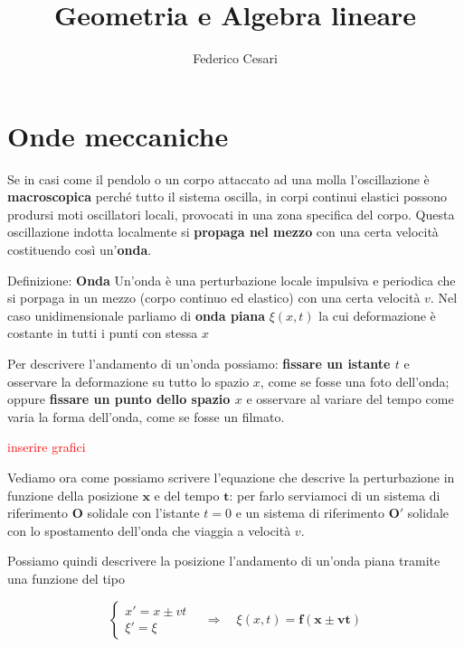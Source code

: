\documentclass[x11names]{article}
\title{Geometria e Algebra lineare}
\author{Federico Cesari}
\date{}
\begin{document}
	

\tableofcontents
\newpage
	
\section{Onde meccaniche}
	Se in casi come il pendolo o un corpo attaccato ad una molla l'oscillazione è \textbf{macroscopica} perché tutto il sistema oscilla, in corpi continui elastici possono prodursi moti oscillatori locali, provocati in una zona specifica del corpo. Questa oscillazione indotta localmente si \textbf{propaga nel mezzo} con una certa velocità costituendo così un'\textbf{onda}.
	
	\begin{center}
		\colorbox{myblue}{\begin{minipage}{5.75in}
				\begin{blues}{Definizione: \textbf{Onda}}
					Un'onda è una perturbazione locale impulsiva e periodica che si porpaga in un mezzo (corpo continuo ed elastico) con una certa velocità \(v\). Nel caso unidimensionale parliamo di \textbf{onda piana} \(\xi(x,t)\) la cui deformazione è costante in tutti i punti con stessa \(x\)
				\end{blues}
		\end{minipage}}
	\end{center}
	
	Per descrivere l'andamento di un'onda possiamo: \textbf{fissare un istante \(t\)} e osservare la deformazione su tutto lo spazio \(x\), come se fosse una foto dell'onda; oppure \textbf{fissare un punto dello spazio \(x\)} e osservare al variare del tempo come varia la forma dell'onda, come se fosse un filmato.
	
	\begin{center}
		\textcolor{red}{inserire grafici}
	\end{center}
	
	Vediamo ora come possiamo scrivere l'equazione che descrive la perturbazione in funzione della posizione \(\mathbf{x}\) e del tempo \(\mathbf{t}\): per farlo serviamoci di un sistema di riferimento \(\mathbf{O}\) solidale con l'istante \(t=0\) e un sistema di riferimento \(\mathbf{O'}\) solidale con lo spostamento dell'onda che viaggia a velocità \(v\).
	
	Possiamo quindi descrivere la posizione l'andamento di un'onda piana tramite una funzione del tipo
	
	\[ 
	\begin{cases} 
		x' = x\pm vt \\ \xi' = \xi 
	\end{cases} 
	\quad \Rightarrow \quad \xi(x,t) = \mathbf{f(x \pm vt)}
	\]
	
\end{document}
